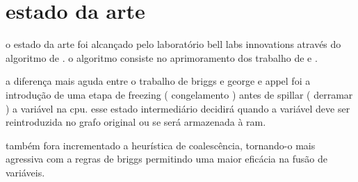 \section{estado da arte}

o estado da arte foi alcançado pelo laboratório bell labs innovations através do algoritmo de  \textcite{irc}.
o algoritmo consiste no aprimoramento dos trabalho de \textcite{briggs} e \textcite{chaitin}.

a diferença mais aguda entre o trabalho de briggs e george e appel foi a introdução de uma etapa de freezing ( congelamento ) antes de spillar ( derramar ) a variável na cpu. esse estado intermediário decidirá quando a variável deve ser reintroduzida no grafo original ou se será armazenada à ram.

também fora incrementado a heurística de coalescência, tornando-o mais agressiva com a regras de briggs permitindo uma maior eficácia na fusão de variáveis. 


